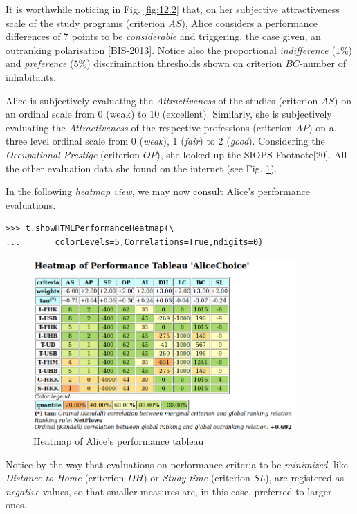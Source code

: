 It is worthwhile noticing in Fig. \ref{fig:12.2} that, on her subjective attractiveness scale of the study programs (criterion $AS$), Alice considers a performance differences of 7 points to be \emph{considerable} and triggering, the case given, an outranking polarisation [BIS-2013]. Notice also the proportional \emph{indifference} ($1\%$) and \emph{preference} ($5\%$) discrimination thresholds shown on criterion $BC$-number of inhabitants.

Alice is subjectively evaluating the \emph{Attractiveness} of the studies (criterion $AS$) on an ordinal scale from 0 (weak) to 10 (excellent). Similarly, she is subjectively evaluating the \emph{Attractiveness} of the respective professions (criterion $AP$) on a three level ordinal scale from 0 (\emph{weak}), 1 (\emph{fair}) to 2 (\emph{good}). Considering the \emph{Occupational Prestige} (criterion $OP$), she looked up the SIOPS Footnote[20]. All the other evaluation data she found on the internet (see Fig. \ref{fig:12.3}).

In the following \emph{heatmap view}, we may now consult Alice's performance evaluations.

\begin{lstlisting}
>>> t.showHTMLPerformanceHeatmap(\
...       colorLevels=5,Correlations=True,ndigits=0)
\end{lstlisting}
\begin{figure}[h]
\sidecaption
\includegraphics[width=10cm]{Figures/aliceHeatmap.png}
\caption{Heatmap of Alice's performance tableau}
\label{fig:12.3}       %
\end{figure}

Notice by the way that evaluations on performance criteria to be \emph{minimized}, like \emph{Distance to Home} (criterion $DH$) or \emph{Study time} (criterion \emph{SL}), are registered as \emph{negative} values, so that smaller measures are, in this case, preferred to larger ones.

